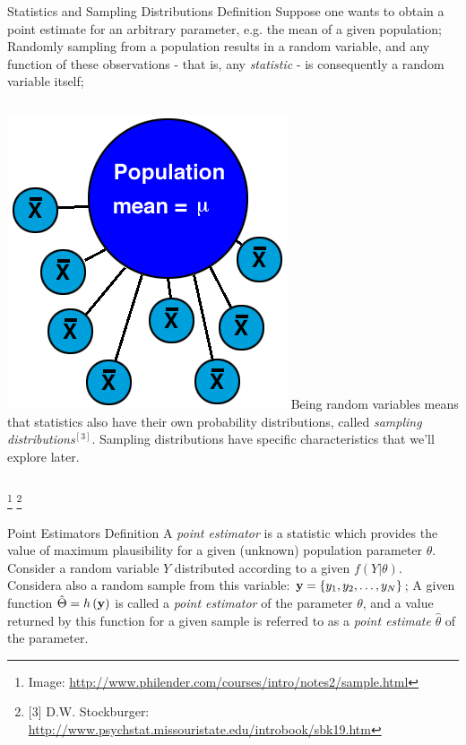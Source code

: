 \documentclass[t]{beamer}
\begin{document}

\begin{ftst}
{Statistics and Sampling Distributions}
{Definition}
Suppose one wants to obtain a point estimate for an arbitrary parameter, e.g. the mean of a given population;
\vone
Randomly sampling from a population results in a random variable, and any function of these observations - that is, any \textit{statistic} - is consequently a random variable itself;
\vhalf
\begin{columns}
\includegraphics[width=\textwidth]{../figs/sam.png}
\vhalf
Being random variables means that statistics also have their own probability distributions, called \textit{sampling distributions}$^{[3]}$. Sampling distributions have specific characteristics that we'll explore later.
\end{columns}
\let\thefootnote\relax\footnote{\tiny Image: \url{http://www.philender.com/courses/intro/notes2/sample.html}}
\let\thefootnote\relax\footnote{\tiny [3] D.W. Stockburger: \url{http://www.psychstat.missouristate.edu/introbook/sbk19.htm}}
\end{ftst}


\begin{ftst}
{Point Estimators}
{Definition}
A \textit{point estimator} is a statistic which provides the value of maximum plausibility for a given (unknown) population parameter $\theta$.
\vone
Consider a random variable $Y$ distributed according to a given $f(Y|\theta)$.
\vone
Considera also a random sample from this variable: $\mathbf{y}=\{y_1,y_2,\ldots,y_N\}$;
\vone
A given function $\hat{\Theta}=h\left(\mathbf{y}\right)$ is called a \textit{point estimator} of the parameter $\theta$, and a value returned by this function for a given sample is referred to as a \textit{point estimate} $\hat{\theta}$ of the parameter.
\end{ftst}
\end{document}
